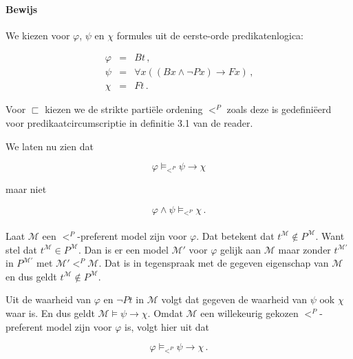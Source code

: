 \documentclass[a4paper,11pt]{article}
\begin{document}
\paragraph{Bewijs}

We kiezen voor $\varphi$, $\psi$ en $\chi$ formules uit de eerste-orde
predikatenlogica:

\begin{eqnarray*}
\varphi & = & Bt \, \mbox{,}\\
\psi    & = & \forall x ((Bx \wedge \neg Px) \rightarrow Fx) \, \mbox{,}\\
\chi    & = & Ft \, \mbox{.}
\end{eqnarray*}

Voor $\sqsubset$ kiezen we de strikte parti\"ele ordening $<^{P}$ zoals deze
is gedefini\"eerd voor predikaatcircumscriptie in definitie 3.1 van de
reader.

We laten nu zien dat

\begin{displaymath}
\varphi \vDash_{<^{P}} \psi \rightarrow \chi
\end{displaymath}

maar niet

\begin{displaymath}
\varphi \wedge \psi \vDash_{<^{P}} \chi \, \mbox{.}
\end{displaymath}

\paragraph{}

Laat $\mathcal{M}$ een $<^{P}$-preferent model zijn voor $\varphi$. Dat
betekent dat $t^{\mathcal{M}} \not \in P^{\mathcal{M}}$. Want stel dat
$t^{\mathcal{M}} \in P^{\mathcal{M}}$. Dan is er een model $\mathcal{M}'$ voor
$\varphi$ gelijk aan $\mathcal{M}$ maar zonder $t^{\mathcal{M}'}$ in
$P^{\mathcal{M}'}$ met $\mathcal{M}' <^{P} \mathcal{M}$. Dat is in tegenspraak
met de gegeven eigenschap van $\mathcal{M}$ en dus geldt $t^{\mathcal{M}} \not
\in P^{\mathcal{M}}$.

Uit de waarheid van $\varphi$ en $\neg Pt$ in $\mathcal{M}$ volgt dat gegeven
de waarheid van $\psi$ ook $\chi$ waar is. En dus geldt $\mathcal{M} \vDash
\psi \rightarrow \chi$. Omdat $\mathcal{M}$ een willekeurig gekozen
$<^{P}$-preferent model zijn voor $\varphi$ is, volgt hier uit dat

\begin{displaymath}
\varphi \vDash_{<^{P}} \psi \rightarrow \chi \, \mbox{.}
\end{displaymath}
\end{document}
